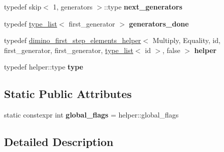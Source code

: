 \begin{DoxyCompactItemize}
\item 
\mbox{\label{struct_eigen_1_1internal_1_1group__theory_1_1dimino__first__step__elements_a71cdd985267c1e020fa1232576d685d2}} 
typedef skip$<$ 1, generators $>$\+::type {\bfseries next\+\_\+generators}
\item 
\mbox{\label{struct_eigen_1_1internal_1_1group__theory_1_1dimino__first__step__elements_ac308c5e3fd190ecc41ac6d3d9e55d268}} 
typedef \hyperlink{struct_eigen_1_1internal_1_1type__list}{type\+\_\+list}$<$ first\+\_\+generator $>$ {\bfseries generators\+\_\+done}
\item 
\mbox{\label{struct_eigen_1_1internal_1_1group__theory_1_1dimino__first__step__elements_aa173ec746139aafc70c8f913673f826d}} 
typedef \hyperlink{struct_eigen_1_1internal_1_1group__theory_1_1dimino__first__step__elements__helper}{dimino\+\_\+first\+\_\+step\+\_\+elements\+\_\+helper}$<$ Multiply, Equality, id, first\+\_\+generator, first\+\_\+generator, \hyperlink{struct_eigen_1_1internal_1_1type__list}{type\+\_\+list}$<$ id $>$, false $>$ {\bfseries helper}
\item 
\mbox{\label{struct_eigen_1_1internal_1_1group__theory_1_1dimino__first__step__elements_a0680cf4fd6fb9846b17aa2eddd775c5c}} 
typedef helper\+::type {\bfseries type}
\end{DoxyCompactItemize}
\subsection*{Static Public Attributes}
\begin{DoxyCompactItemize}
\item 
\mbox{\label{struct_eigen_1_1internal_1_1group__theory_1_1dimino__first__step__elements_a7129d35d0708889aa26473837de90626}} 
static constexpr int {\bfseries global\+\_\+flags} = helper\+::global\+\_\+flags
\end{DoxyCompactItemize}


\subsection{Detailed Description}
